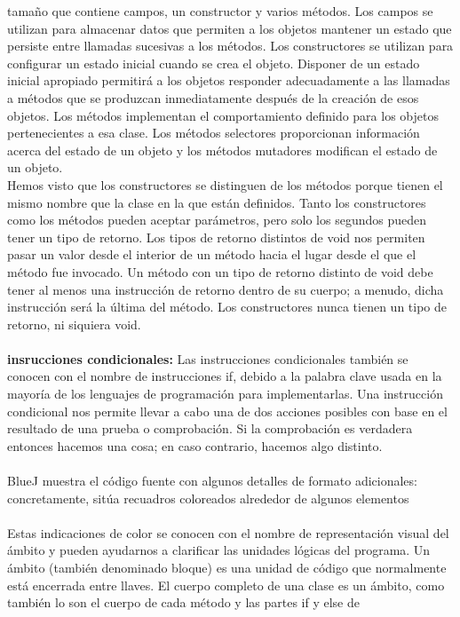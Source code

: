 \documentclass[11pt,a4paper]{article}
\begin{document}
	tamaño que contiene campos, un constructor y varios métodos. Los campos se utilizan para almacenar
	datos que permiten a los objetos mantener un estado que persiste entre llamadas sucesivas
	a los métodos. Los constructores se utilizan para configurar un estado inicial cuando se crea el
	objeto. Disponer de un estado inicial apropiado permitirá a los objetos responder adecuadamente
	a las llamadas a métodos que se produzcan inmediatamente después de la creación de esos objetos.
	Los métodos implementan el comportamiento definido para los objetos pertenecientes a esa
	clase. Los métodos selectores proporcionan información acerca del estado de un objeto y los métodos
	mutadores modifican el estado de un objeto.\\
	Hemos visto que los constructores se distinguen de los métodos porque tienen el mismo nombre
	que la clase en la que están definidos. Tanto los constructores como los métodos pueden aceptar
	parámetros, pero solo los segundos pueden tener un tipo de retorno. Los tipos de retorno distintos
	de void nos permiten pasar un valor desde el interior de un método hacia el lugar desde el que el
	método fue invocado. Un método con un tipo de retorno distinto de void debe tener al menos una
	instrucción de retorno dentro de su cuerpo; a menudo, dicha instrucción será la última del método.
	Los constructores nunca tienen un tipo de retorno, ni siquiera void.\\
	\\
	\textbf{insrucciones condicionales:} Las instrucciones condicionales también se conocen con el nombre de instrucciones if, debido
	a la palabra clave usada en la mayoría de los lenguajes de programación para implementarlas.
	Una instrucción condicional nos permite llevar a cabo una de dos acciones posibles con base en
	el resultado de una prueba o comprobación. Si la comprobación es verdadera entonces hacemos
	una cosa; en caso contrario, hacemos algo distinto. \\
	\\
	BlueJ muestra el código fuente con algunos detalles de formato adicionales:
	concretamente, sitúa recuadros coloreados alrededor de algunos elementos\\
	\\
	Estas indicaciones de color se conocen con el nombre de representación visual del ámbito y pueden
	ayudarnos a clarificar las unidades lógicas del programa. Un ámbito (también denominado
	bloque) es una unidad de código que normalmente está encerrada entre llaves. El cuerpo completo
	de una clase es un ámbito, como también lo son el cuerpo de cada método y las partes if y else de
\end{document}
